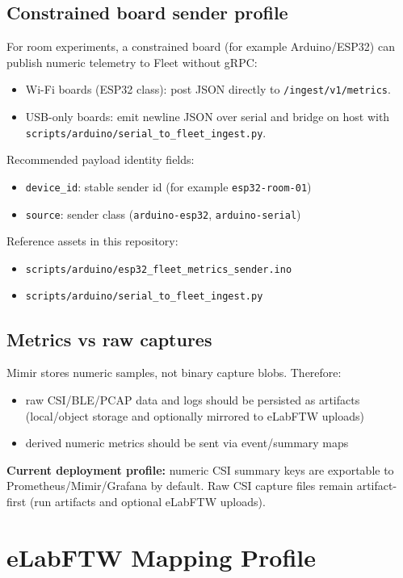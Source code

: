 \documentclass[11pt,a4paper]{article}
\begin{document}
\subsection{Constrained board sender profile}
For room experiments, a constrained board (for example Arduino/ESP32) can publish numeric telemetry to Fleet without gRPC:
\begin{itemize}
  \item Wi-Fi boards (ESP32 class): post JSON directly to \texttt{/ingest/v1/metrics}.
  \item USB-only boards: emit newline JSON over serial and bridge on host with \texttt{scripts/arduino/serial\_to\_fleet\_ingest.py}.
\end{itemize}
Recommended payload identity fields:
\begin{itemize}
  \item \texttt{device\_id}: stable sender id (for example \texttt{esp32-room-01})
  \item \texttt{source}: sender class (\texttt{arduino-esp32}, \texttt{arduino-serial})
\end{itemize}
Reference assets in this repository:
\begin{itemize}
  \item \texttt{scripts/arduino/esp32\_fleet\_metrics\_sender.ino}
  \item \texttt{scripts/arduino/serial\_to\_fleet\_ingest.py}
\end{itemize}

\subsection{Metrics vs raw captures}
Mimir stores numeric samples, not binary capture blobs.
Therefore:
\begin{itemize}
  \item raw CSI/BLE/PCAP data and logs should be persisted as artifacts (local/object storage and optionally mirrored to eLabFTW uploads)
  \item derived numeric metrics should be sent via event/summary maps
\end{itemize}
\textbf{Current deployment profile:} numeric CSI summary keys are exportable to Prometheus/Mimir/Grafana by default.
Raw CSI capture files remain artifact-first (run artifacts and optional eLabFTW uploads).

\section{eLabFTW Mapping Profile}
\end{document}

